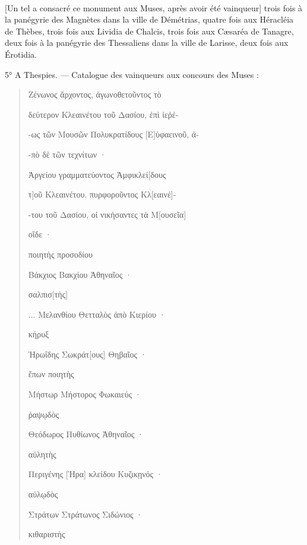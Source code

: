 \documentclass[landscape, a4paper, 11pt, oneside, polutonikogreek, french]{article}
\begin{document}
\paragraph{}
[Un tel a consacré ce monument aux Muses, après avoir été vainqueur] trois fois à la panégyrie des Magnètes dans la ville de Démétrias, quatre fois aux Héracléia de Thèbes, trois fois aux Lividia de Chalcis, trois fois aux Cæsaréa de Tanagre, deux fois à la panégyrie des Thessaliens dans la ville de Larisse, deux fois aux Érotidia.

5° A Thespies. --- Catalogue des vainqueurs aux concours des Muses :
\begin{quotation}
Ζένωνος ἄρχοντος, ἀγωνοθετοῦντος τὸ

δεύτερον Κλεαινέτου τοῦ Δασίου, ἐπὶ ἱεῤέ-

-ως τῶν Μουσῶν Πολυκρατίδους [Ε]ὐφαεινοῦ, ἀ-

-πὸ δὲ τῶν τεχνίτων ·

Ἀργείου γραμματεύοντος Ἀμφικλεί[δους

τ]οῦ Κλεαινέτου. πυρφοροῦντος Κλ[εαινέ]-

-του τοῦ Δασίου, οἱ νικήσαντες τὰ Μ[ουσεῖα]

οἵδε ·

\hspace*{5mm}ποιητὴς προσοδίου

Βάκχιος Βακχίου Ἀθηναῖος ·

\hspace*{5mm}σαλπισ[τὴς]

... Μελανθίου Θετταλὸς ἀπὸ Κιερίου ·

\hspace*{5mm}κήρυξ

Ἡρωΐδης Σωκράτ[ους] Θηβαῖος ·

\hspace*{5mm}ἔπων ποιητὴς

Μήστωρ Μήστορος Φωκαιεύς ·

\hspace*{5mm}ῥαψῳδὸς

Θεόδωρος Πυθίωνος Ἀθηναῖος ·

\hspace*{5mm}αὐλητὴς

Περιγένης [Ἡρα] κλείδου Κυζικῃνός ·

\hspace*{5mm}αὐλῳδὸς

Στράτων Στράτωνος Σιδώνιος ·

\hspace*{5mm}κιθαριστὴς


\end{quotation}
\end{document}
